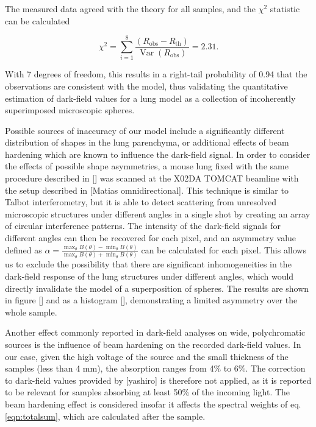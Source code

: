 
The measured data agreed with the
theory for all samples, and the $\chi^2$ statistic can be calculated

\begin{equation}
    \chi^2 = \sum_{i=1}^8 \dfrac{(R_{\text{obs}} -
    R_{\text{th}})}{\mathop{Var}(R_{\text{obs}})} = 2.31.
    \label{eqn:chisq}
\end{equation}

With 7 degrees of freedom, this results in a right-tail probability of 0.94 that the 
observations are consistent with the model, thus validating the quantitative estimation of
dark-field values for a lung model as a collection of incoherently
superimposed microscopic spheres.

Possible sources of inaccuracy of our model include a significantly
different distribution of shapes in the lung parenchyma, or additional
effects of beam hardening which are known to influence the dark-field
signal. In order to consider the effects of possible shape asymmetries, a
mouse lung fixed with the same procedure described in [] was scanned at the
X02DA TOMCAT beamline with the setup described in [Matias omnidirectional].
This technique is similar to Talbot interferometry, but it is able to detect
scattering from unresolved microscopic structures under different angles in
a single shot by
creating an array of circular interference patterns. The intensity of the
dark-field signals for different angles can then be recovered for each
pixel, and an asymmetry value defined as $\alpha =
\frac{\max_\theta{B(\theta)} -
\min_\theta{B(\theta)}}{\max_\theta{B(\theta)} + \min_\theta{B(\theta)}}$
can be calculated for each pixel. This allows us to exclude the possibility
that there are significant inhomogeneities in the dark-field response of the
lung structures under different angles, which would directly invalidate the
model of a superposition of spheres. The results are shown in figure [] and
as a histogram [], demonstrating a limited asymmetry over the whole sample.

Another effect commonly reported in dark-field analyses on wide, polychromatic
sources is the influence of beam hardening on the recorded dark-field
values. In our case, given the high voltage of the source and the small
thickness of the samples (less than 4 mm), the absorption ranges from 4\% to
6\%. The correction to dark-field values provided by [yashiro] is therefore
not applied, as it is reported to be relevant for samples absorbing at least
50\% of the incoming light. The beam hardening effect is considered insofar
it affects the spectral weights of eq. \ref{eqn:totalsum}, which are calculated
after the sample.
